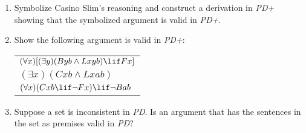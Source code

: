 \documentclass[12pt,letterpaper]{article}
\begin{document}
\begin{enumerate}
    \item
      Symbolize Casino Slim's reasoning and
      construct a derivation in \textit{PD+}
      showing that the symbolized argument is valid in \textit{PD+}.


    \item Show the following argument is valid in \textit{PD+}:

      \begin{tabular}{l}
        $(\forall x)[(\exists y)(Byb \land Lxyb) \lif Fx]$ \\
        $(\exists x)(Cxb \land Lxab)$ \\
        \hline
        $(\forall x)(Cxb \lif \neg Fx) \lif \neg Bab$
      \end{tabular}

    \item
      Suppose a set is inconsistent in \textit{PD}.
      Is an argument that has the sentences in the set as premises valid in \textit{PD}?


\end{enumerate}
\end{document}
